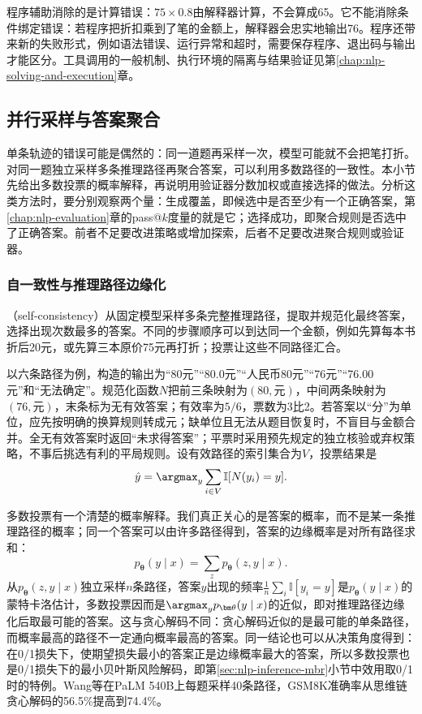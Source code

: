 程序辅助消除的是计算错误：$75\times0.8$由解释器计算，不会算成65。它不能消除条件绑定错误：若程序把折扣乘到了笔的金额上，解释器会忠实地输出76。程序还带来新的失败形式，例如语法错误、运行异常和超时，需要保存程序、退出码与输出才能区分。工具调用的一般机制、执行环境的隔离与结果验证见第\ref{chap:nlp-solving-and-execution}章。

\subsection{并行采样与答案聚合}
\label{sec:nlp-reasoning-parallel}

单条轨迹的错误可能是偶然的：同一道题再采样一次，模型可能就不会把笔打折。对同一题独立采样多条推理路径再聚合答案，可以利用多数路径的一致性。本小节先给出多数投票的概率解释，再说明用验证器分数加权或直接选择的做法。分析这类方法时，要分别观察两个量：生成覆盖，即候选中是否至少有一个正确答案，第\ref{chap:nlp-evaluation}章的pass@$k$度量的就是它；选择成功，即聚合规则是否选中了正确答案。前者不足要改进策略或增加探索，后者不足要改进聚合规则或验证器。

\subsubsection{自一致性与推理路径边缘化}
\label{sec:nlp-execution-self-consistency}

（self-consistency）从固定模型采样多条完整推理路径，提取并规范化最终答案，选择出现次数最多的答案。不同的步骤顺序可以到达同一个金额，例如先算每本书折后20元，或先算三本原价75元再打折；投票让这些不同路径汇合。

以六条路径为例，构造的输出为“80元”“80.0元”“人民币80元”“76元”“76.00元”和“无法确定”。规范化函数$N$把前三条映射为$(80,\text{元})$，中间两条映射为$(76,\text{元})$，末条标为无有效答案；有效率为$5/6$，票数为3比2。若答案以“分”为单位，应先按明确的换算规则转成元；缺单位且无法从题目恢复时，不盲目与金额合并。全无有效答案时返回“未求得答案”；平票时采用预先规定的独立核验或弃权策略，不事后挑选有利的平局规则。设有效路径的索引集合为$V$，投票结果是
\begin{equation}
  \hat y=\argmax_y\sum_{i\in V}\mathbb{I}[N(y_i)=y].
  \label{eq:nlp-reasoning-majority-vote}
\end{equation}

多数投票有一个清楚的概率解释。我们真正关心的是答案的概率，而不是某一条推理路径的概率；同一个答案可以由许多路径得到，答案的边缘概率是对所有路径求和：
\begin{equation}
  p_{\bm\theta}(y\mid x)=\sum_{z}p_{\bm\theta}(z,y\mid x).
  \label{eq:nlp-reasoning-path-marginal}
\end{equation}
从$p_{\bm\theta}(z,y\mid x)$独立采样$n$条路径，答案$y$出现的频率$\frac1n\sum_i\mathbb I[y_i=y]$是$p_{\bm\theta}(y\mid x)$的蒙特卡洛估计，多数投票因而是$\argmax_yp_{\bm\theta}(y\mid x)$的近似，即对推理路径边缘化后取最可能的答案。这与贪心解码不同：贪心解码近似的是最可能的单条路径，而概率最高的路径不一定通向概率最高的答案。同一结论也可以从决策角度得到：在0/1损失下，使期望损失最小的答案正是边缘概率最大的答案，所以多数投票也是0/1损失下的最小贝叶斯风险解码，即第\ref{sec:nlp-inference-mbr}小节中效用取0/1时的特例。Wang等在PaLM 540B上每题采样40条路径，GSM8K准确率从思维链贪心解码的56.5\%提高到74.4\%。

